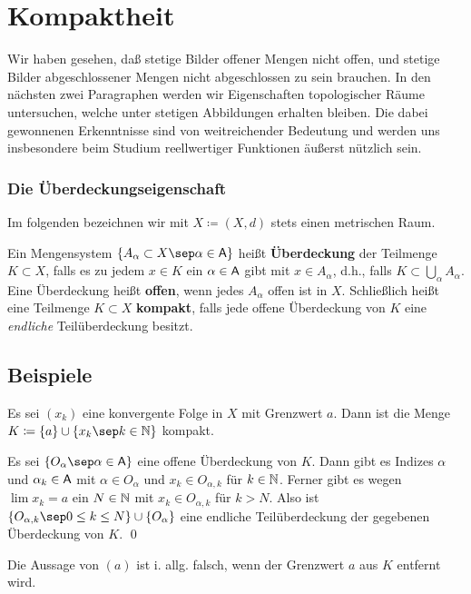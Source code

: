 \documentclass[a4paper,twoside]{book}
\begin{document}
\section{Kompaktheit}

Wir haben gesehen, daß stetige Bilder offener Mengen nicht offen, und stetige Bilder
abgeschlossener Mengen nicht abgeschlossen zu sein brauchen. In den nächsten
zwei Paragraphen werden wir Eigenschaften topologischer Räume untersuchen,
welche unter stetigen Abbildungen erhalten bleiben. Die dabei gewonnenen Erkenntnisse
sind von weitreichender Bedeutung und werden uns insbesondere beim
Studium reellwertiger Funktionen äußerst nützlich sein.
\medskip
\subsubsection{Die Überdeckungseigenschaft}
\smallskip
Im folgenden bezeichnen wir mit $X \coloneqq (X, d)$ stets einen metrischen Raum.
\smallskip

Ein Mengensystem  $\{ A_\alpha \subset X  \sep \alpha \in \A \}$ heißt \textbf{Überdeckung} der Teilmenge 
$K \subset X$, falls es zu jedem $x \in K$ ein $\alpha \in \mathsf{A}$ gibt mit $x \in A_\alpha$, d.h., falls $K \subset \bigcup_\alpha A_\alpha$. 
Eine Überdeckung heißt \textbf{offen}, wenn jedes $A_\alpha$ offen ist in $X$. Schließlich heißt eine 
Teilmenge $K \subset X$ \textbf{kompakt}, falls jede offene Überdeckung von $K$ eine \textit{endliche}
Teilüberdeckung besitzt.

\subsection{Beispiele}  Es sei $(x_k)$ eine konvergente Folge in $X$ mit Grenzwert $a$. Dann
ist die Menge $K \coloneqq \{a\} \cup \{x_k \sep k \in \N\}$ kompakt. 

\begin{Beweis0}
Es sei $\{ O_\alpha \sep \alpha \in \A\}$ eine offene Überdeckung von $K$. Dann gibt es Indizes $\alpha$ und $\alpha_k \in \mathsf{A}$ mit $\alpha \in O_\alpha$ und $x_k \in O_{\alpha,k}$ für $k \in \mathbb{N}$. 
Ferner gibt es wegen $\lim x_k = a$ ein $N \in \mathbb{N}$ mit $x_k \in O_{\alpha,k}$ für $k > N$. 
Also ist $\{ O_{\alpha,k} \sep 0 \le k \le N\} \cup \{O_\alpha\}$ eine endliche Teilüberdeckung der gegebenen Überdeckung von $K$. \qed
\end{Beweis0}

\noindent{} Die Aussage von $(a)$ ist i. allg. falsch, wenn der Grenzwert $a$ aus $K$ entfernt wird.
\end{document}
